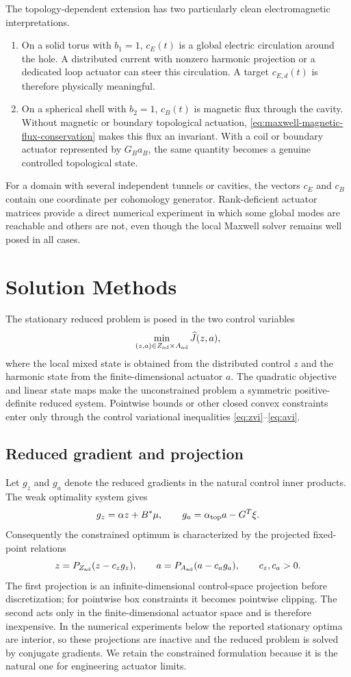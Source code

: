 \documentclass{article}
\begin{document}
The topology-dependent extension has two particularly clean electromagnetic interpretations.
\begin{enumerate}
\item On a solid torus with $b_1=1$, $c_E(t)$ is a global electric circulation around the hole.  A distributed current with nonzero harmonic projection or a dedicated loop actuator can steer this circulation.  A target $c_{E,d}(t)$ is therefore physically meaningful.
\item On a spherical shell with $b_2=1$, $c_B(t)$ is magnetic flux through the cavity.  Without magnetic or boundary topological actuation, \eqref{eq:maxwell-magnetic-flux-conservation} makes this flux an invariant.  With a coil or boundary actuator represented by $G_Ba_B$, the same quantity becomes a genuine controlled topological state.
\end{enumerate}
For a domain with several independent tunnels or cavities, the vectors $c_E$ and $c_B$ contain one coordinate per cohomology generator.  Rank-deficient actuator matrices provide a direct numerical experiment in which some global modes are reachable and others are not, even though the local Maxwell solver remains well posed in all cases.

\section{Solution Methods}
\label{sec:solution-methods}

The stationary reduced problem is posed in the two control variables
\[
  \min_{(z,a)\in Z_{\rm ad}\times A_{\rm ad}}\widehat J(z,a),
\]
where the local mixed state is obtained from the distributed control $z$ and the harmonic state from the finite-dimensional actuator $a$.  The quadratic objective and linear state maps make the unconstrained problem a symmetric positive-definite reduced system.  Pointwise bounds or other closed convex constraints enter only through the control variational inequalities \eqref{eq:zvi}--\eqref{eq:avi}.

\subsection{Reduced gradient and projection}
\label{sec:reduced-gradient-methods}

Let $g_z$ and $g_a$ denote the reduced gradients in the natural control inner products.  The weak optimality system gives
\[
  g_z=\alpha z+B^*\mu,
  \qquad
  g_a=\alpha_{\rm top}a-G^T\xi.
\]
Consequently the constrained optimum is characterized by the projected fixed-point relations
\[
  z=P_{Z_{\rm ad}}(z-c_z g_z),
  \qquad
  a=P_{A_{\rm ad}}(a-c_a g_a),
  \qquad c_z,c_a>0.
\]
The first projection is an infinite-dimensional control-space projection before discretization; for pointwise box constraints it becomes pointwise clipping.  The second acts only in the finite-dimensional actuator space and is therefore inexpensive.  In the numerical experiments below the reported stationary optima are interior, so these projections are inactive and the reduced problem is solved by conjugate gradients.  We retain the constrained formulation because it is the natural one for engineering actuator limits.
\end{document}
